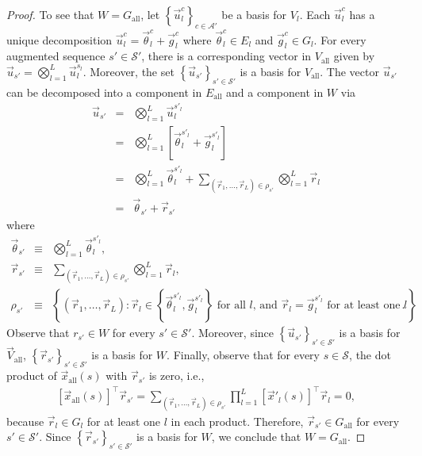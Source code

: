 \documentclass{article}
\numberwithin{myclaim}{section}
\newcommand{\set}[1]{\left\{ #1 \right\}}
\begin{document}
\begin{proof}
To see that $W = G_\mathrm{all}$, let $\set{\vec{u}^c_l}_{c \in \mathcal{A}'}$ be a basis for $V_{l}$. Each $\vec{u}^c_l$ has a unique decomposition $\vec{u}^c_l = \vec{\theta}_l^c + \vec{g}_l^c$ where $\vec{\theta}_l^c \in E_l$ and $\vec{g}_l^c \in G_l$. For every augmented sequence $s' \in \mathcal{S}'$, there is a corresponding vector in $V_\mathrm{all}$ given by $\vec{u}_{s'} = \bigotimes_{l=1}^L \vec{u}_l^{s_l}$. Moreover, the set $\set{\vec{u}_{s'}}_{s' \in \mathcal{S'}}$ is a basis for $V_\mathrm{all}$. The vector $\vec{u}_{s'}$ can be decomposed into a component in $E_\mathrm{all}$ and a component in $W$ via
\begin{eqnarray}
    \vec{u}_{s'} &=& \bigotimes_{l=1}^L \vec{u}_l^{s'_l} \\
    &=& \bigotimes_{l=1}^L \left[ \vec{\theta}_l^{s'_l} + \vec{g}_l^{s'_l} \right] \\
    &=& \bigotimes_{l=1}^L \vec{\theta}_l^{s'_l} + \sum_{(\vec{r}_1, \ldots, \vec{r}_L) \in \rho_{s'}} \bigotimes_{l=1}^L \vec{r}_l \\
    &=&  \vec{\theta}_{s'} + \vec{r}_{s'} \
\end{eqnarray}
where
\begin{eqnarray}
 \vec{\theta}_{s'} &\equiv& \bigotimes_{l=1}^L \vec{\theta}_l^{s'_l}, \\
 \vec{r}_{s'} &\equiv& \sum_{(\vec{r}_1, \ldots, \vec{r}_L) \in \rho_{s'}} \bigotimes_{l=1}^L \vec{r}_l, \\
    \rho_{s'} &\equiv& \set{(\vec{r}_1, \ldots, \vec{r}_L): \vec{r}_l \in \set{\vec{\theta}_l^{s'_l},\vec{g}_l^{s'_l} }\textrm{~for all $l$, and~}\vec{r}_l = \vec{g}_l^{s'_l} \textrm{~for at least one $l$}}.
\end{eqnarray}
Observe that $r_{s'} \in W$ for every $s' \in \mathcal{S}'$. Moreover, since $\set{\vec{u}_{s'}}_{s' \in \mathcal{S}'}$ is a basis for $\vec{V}_\mathrm{all}$, $\set{\vec{r}_{s'}}_{s' \in \mathcal{S}'}$ is a basis for $W$. Finally, observe that for every $s \in \mathcal{S}$, the dot product of $\vec{x}_\mathrm{all}(s)$ with $\vec{r}_{s'}$ is zero, i.e.,
\begin{eqnarray}
    \left[\vec{x}_\mathrm{all}(s) \right]^\top \vec{r}_{s'} = \sum_{(\vec{r}_1, \ldots, \vec{r}_L) \in \rho_{s'}} \prod_{l=1}^L \left[\vec{x}'_l(s) \right]^\top \vec{r}_l = 0,
\end{eqnarray}
because $\vec{r}_l \in G_l$ for at least one $l$ in each product. Therefore, $\vec{r}_{s'} \in G_\mathrm{all}$ for every $s' \in \mathcal{S}'$. Since $\set{\vec{r}_{s'}}_{s' \in \mathcal{S}'}$ is a basis for $W$, we conclude that $W = G_\mathrm{all}$.

\end{proof}
\end{document}
